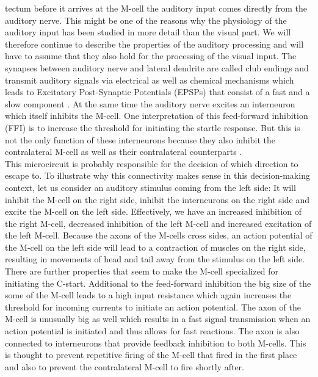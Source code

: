 \documentclass[a4paper,10pt,hidelinks]{scrreprt}
\begin{document}
	tectum before it arrives at the M-cell the auditory input comes directly from the auditory 
	nerve.
	This might be one of the reasons why the physiology of the auditory input has been studied in 
	more detail than the visual part.
	We will therefore continue to describe the properties of the auditory processing and will have 
	to assume that they also hold for the processing of the visual input.
	The synapses between auditory nerve and lateral dendrite are called club endings and transmit 
	auditory signals via electrical as well as chemical mechanisms which leads to Excitatory 
	Post-Synaptic Potentials (EPSPs) that consist of a fast and a slow component \citep{Korn2005}.
	At the same time the auditory nerve excites an interneuron which itself inhibits the M-cell.
	One interpretation of this feed-forward inhibition (FFI) is to increase the threshold for 
	initiating the startle response.
	But this is not the only function of these interneurons because they also inhibit the 
	contralateral M-cell as well as their contralateral counterparts \citep{Koyama2016}.\\
	This microcircuit is probably responsible for the decision of which direction to escape to.
	To illustrate why this connectivity makes sense in this decision-making context, let us 
	consider an auditory stimulus coming from the left side:
	It will inhibit the M-cell on the right side, inhibit the interneurons on the right side and 
	excite the M-cell on the left side.
	Effectively, we have an increased inhibition of the right M-cell, decreased inhibition of the 
	left M-cell and increased excitation of the left M-cell.
	Because the axons of the M-cells cross sides, an action potential of the M-cell on the left 
	side will lead to a contraction of muscles on the right side, resulting in movements of head 
	and tail away from the stimulus on the left side.\\
	There are further properties that seem to make the M-cell specialized for initiating the 
	C-start.
	Additional to the feed-forward inhibition the big size of the some of the M-cell leads to a 
	high input resistance which again increases the threshold for incoming currents to initiate an 
	action potential.
	The axon of the M-cell is unusually big as well which results in a fast signal transmission 
	when an action potential is initiated and thus allows for fast reactions.
	The axon is also connected to interneurons that provide feedback inhibition to both M-cells.
	This is thought to prevent repetitive firing of the M-cell that fired in the first place and 
	also to prevent the contralateral M-cell to fire shortly after.
\end{document}
